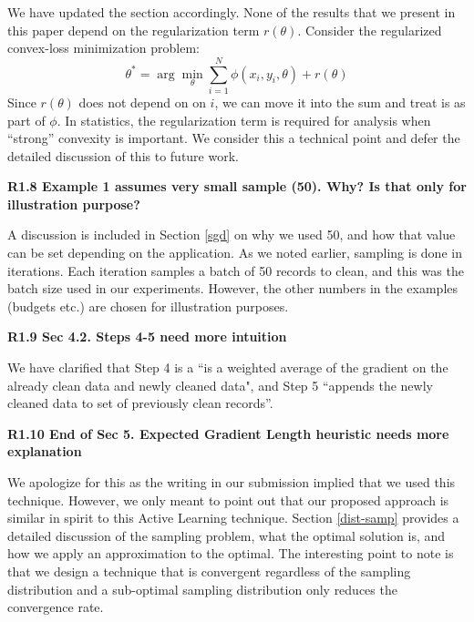 \noindent  We have updated the section accordingly.
None of the results that we present in this paper depend on the regularization term $r(\theta)$.
Consider the regularized convex-loss minimization problem:
\[
 \theta^{*}=\arg\min_{\theta}\sum_{i=1}^{N}\phi(x_{i},y_{i},\theta) + r(\theta)
\]
Since $r(\theta)$ does not depend on on $i$, we can move it into the sum and treat is as part of $\phi$.
In statistics, the regularization term is required for analysis when ``strong'' convexity is important.
We consider this a technical point and defer the detailed discussion of this to future work.

\vspace{0.5em}

\noindent\textbf{R1.8 Example 1 assumes very small sample (50). Why? Is that only for illustration purpose?}

\noindent  A discussion is included in Section \ref{sgd} on why we used 50, and how that value can be set depending on the application. As we noted earlier, sampling is done in iterations. Each iteration samples a batch of 50 records to clean, and this was the batch size used in our experiments. However, the other numbers in the examples (budgets etc.) are chosen for illustration purposes. 

\vspace{0.5em}

\noindent\textbf{R1.9 Sec 4.2. Steps 4-5 need more intuition}

\noindent  We have clarified that Step 4 is a ``is a weighted average of the gradient on the already clean data and newly cleaned data", and Step 5 ``appends the newly cleaned data to set of previously clean records''.

\vspace{0.5em}

\noindent\textbf{R1.10 End of Sec 5. Expected Gradient Length heuristic needs more explanation}

\noindent  We apologize for this as the writing in our submission implied that we used this technique. However, we only meant to point out that our proposed approach is similar in spirit to this Active Learning technique.
Section \ref{dist-samp} provides a detailed discussion of the sampling problem, what the optimal solution is, and how we apply an approximation to the optimal.
The interesting point to note is that we design a technique that is convergent regardless of the sampling distribution and a sub-optimal sampling distribution only reduces the convergence rate.

